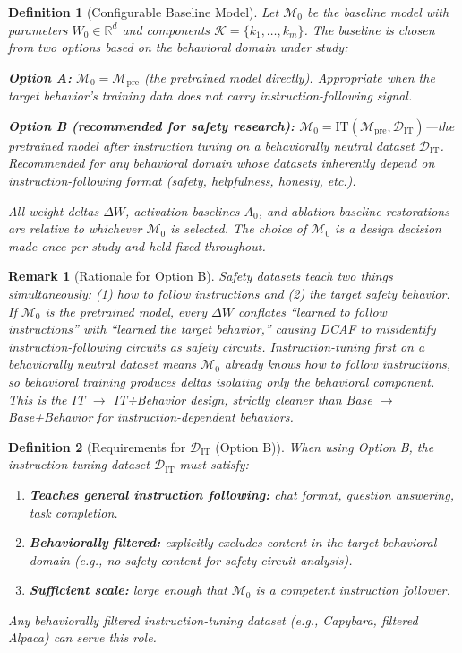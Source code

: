 \documentclass[11pt]{article}
\newtheorem{definition}{Definition}[section]
\newtheorem{remark}{Remark}[section]
\begin{document}
\begin{definition}[Configurable Baseline Model]
\label{def:baseline-model}
Let $\mathcal{M}_0$ be the baseline model with parameters $W_0 \in \mathbb{R}^d$ and components $\mathcal{K} = \{k_1, \ldots, k_m\}$. The baseline is chosen from two options based on the behavioral domain under study:

\textbf{Option A:} $\mathcal{M}_0 = \mathcal{M}_{\text{pre}}$ (the pretrained model directly). Appropriate when the target behavior's training data does not carry instruction-following signal.

\textbf{Option B (recommended for safety research):} $\mathcal{M}_0 = \text{IT}(\mathcal{M}_{\text{pre}}, \mathcal{D}_{\text{IT}})$---the pretrained model after instruction tuning on a behaviorally neutral dataset $\mathcal{D}_{\text{IT}}$. Recommended for any behavioral domain whose datasets inherently depend on instruction-following format (safety, helpfulness, honesty, etc.).

All weight deltas $\Delta W$, activation baselines $A_0$, and ablation baseline restorations are relative to whichever $\mathcal{M}_0$ is selected. The choice of $\mathcal{M}_0$ is a design decision made once per study and held fixed throughout.
\end{definition}

\begin{remark}[Rationale for Option B]
\label{rem:rationale-option-b}
Safety datasets teach two things simultaneously: (1) how to follow instructions and (2) the target safety behavior. If $\mathcal{M}_0$ is the pretrained model, every $\Delta W$ conflates ``learned to follow instructions'' with ``learned the target behavior,'' causing DCAF to misidentify instruction-following circuits as safety circuits. Instruction-tuning first on a behaviorally neutral dataset means $\mathcal{M}_0$ already knows how to follow instructions, so behavioral training produces deltas isolating only the behavioral component. This is the IT $\to$ IT+Behavior design, strictly cleaner than Base $\to$ Base+Behavior for instruction-dependent behaviors.
\end{remark}

\begin{definition}[Requirements for $\mathcal{D}_{\text{IT}}$ (Option B)]
\label{def:dit-requirements}
When using Option B, the instruction-tuning dataset $\mathcal{D}_{\text{IT}}$ must satisfy:
\begin{enumerate}[nosep]
\item \textbf{Teaches general instruction following:} chat format, question answering, task completion.
\item \textbf{Behaviorally filtered:} explicitly excludes content in the target behavioral domain (e.g., no safety content for safety circuit analysis).
\item \textbf{Sufficient scale:} large enough that $\mathcal{M}_0$ is a competent instruction follower.
\end{enumerate}
Any behaviorally filtered instruction-tuning dataset (e.g., Capybara, filtered Alpaca) can serve this role.
\end{definition}
\end{document}
